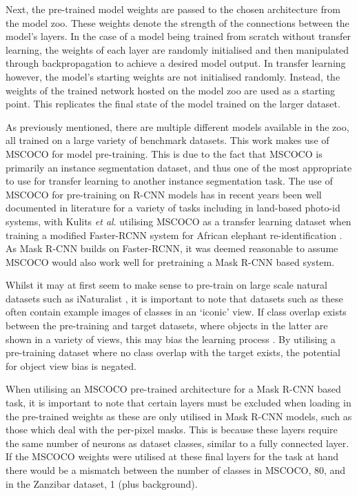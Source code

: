 Next, the pre-trained model weights are passed to the chosen architecture from the model zoo. These weights denote the strength of the connections between the model's layers. In the case of a model being trained from scratch without transfer learning, the weights of each layer are randomly initialised and then manipulated through backpropagation to achieve a desired model output. In transfer learning however, the model's starting weights are not initialised randomly. Instead, the weights of the trained network hosted on the model zoo are used as a starting point. This replicates the final state of the model trained on the larger dataset. 

As previously mentioned, there are multiple different models available in the zoo, all trained on a large variety of benchmark datasets. This work makes use of MSCOCO \cite{lin_microsoft_2014} for model pre-training. This is due to the fact that MSCOCO is primarily an instance segmentation dataset, and thus one of the most appropriate to use for transfer learning to another instance segmentation task. The use of MSCOCO for pre-training on R-CNN models has in recent years been well documented in literature for a variety of tasks \cite{yu_fruit_2019, couteaux_automatic_2019, fujita_fine-tuned_2020} including in land-based photo-id systems, with Kulits \textit{et al}. utilising MSCOCO as a transfer learning dataset when training a modified Faster-RCNN system for African elephant re-identification \cite{kulits_elephantbook_2021}. As Mask R-CNN builds on Faster-RCNN, it was deemed reasonable to assume MSCOCO would also work well for pretraining a Mask R-CNN based system.

Whilst it may at first seem to make sense to pre-train on large scale natural datasets such as iNaturalist \cite{van_horn_inaturalist_2018}, it is important to note that datasets such as these often contain example images of classes in an `iconic' view. If class overlap exists between the pre-training and target datasets, where objects in the latter are shown in a variety of views, this may bias the learning process \cite{pantazis_focus_2021}. By utilising a pre-training dataset where no class overlap with the target exists, the potential for object view bias is negated. 

When utilising an MSCOCO pre-trained architecture for a Mask R-CNN based task, it is important to note that certain layers must be excluded when loading in the pre-trained weights as these are only utilised in Mask R-CNN models, such as those which deal with the per-pixel masks. This is because these layers require the same number of neurons as dataset classes, similar to a fully connected layer. If the MSCOCO weights were utilised at these final layers for the task at hand there would be a mismatch between the number of classes in MSCOCO, 80, and in the Zanzibar dataset, 1 (plus background).

